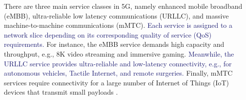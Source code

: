\documentclass[lettersize,journal]{IEEEtran}
\begin{document}
There are three main service classes in 5G, namely enhanced mobile broadband (eMBB), ultra-reliable low latency communications (URLLC), and massive machine-to-machine communications (mMTC). \textcolor{MidnightBlue}{Each service is assigned to a network slice depending on its corresponding quality of service (QoS) requirements.}
For instance, the eMBB service demands high capacity and throughput,  e.g., 8K video streaming and immersive gaming. \textcolor{MidnightBlue}{Meanwhile, the URLLC service provides ultra-reliable and low-latency connectivity, e.g., for autonomous vehicles, Tactile Internet, and remote surgeries.} Finally, mMTC services require connectivity for a large number of Internet of Things (IoT) devices that transmit small payloads \cite{dogra2020survey,alsenwi2021intelligent,SL}.




\end{document}
